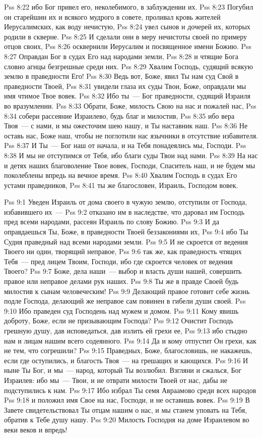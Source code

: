 \vs Pss 8:22
ибо Бог привел его, неколебимого, в заблуждении их.
\vs Pss 8:23
Погубил он старейшин их и всякого мудрого в совете, проливал кровь
жителей Иерусалимских, как воду нечистую,
\vs Pss 8:24
увел сынов и дочерей их, которых родили в скверне.
\vs Pss 8:25
И сделали они в меру нечистоты своей по примеру отцов своих,
\vs Pss 8:26
осквернили Иерусалим и посвященное имени Божию.
\vs Pss 8:27
Оправдан Бог в судах Его над народами земли,
\vs Pss 8:28
и чтящие Бога словно агнцы безгрешные среди них.
\vs Pss 8:29
Хвалим Господь, судящий всякую землю в праведности Его!
\vs Pss 8:30
Ведь вот, Боже, явил Ты нам суд Свой в праведности Твоей,
\vs Pss 8:31
увидели глаза их суды Твои, Боже, оправдали мы имя чтимое Твое
вовек.
\vs Pss 8:32
Ибо ты~--- Бог праведности, судящий Израиля во вразумлении.
\vs Pss 8:33
Обрати, Боже, милость Свою на нас и пожалей нас,
\vs Pss 8:34
собери рассеяние Израилево, будь благ и милостив,
\vs Pss 8:35
ибо вера Твоя~--- с нами, и мы ожесточим шею нашу, и Ты наставник
наш.
\vs Pss 8:36
Не оставь нас, Боже наш, чтобы не поглотили нас язычники в
отсутствие избавителя.
\vs Pss 8:37
И Ты~--- Бог наш от начала, и на Тебя понадеялись мы,
Господи.
\vs Pss 8:38
И мы не отступимся от Тебя, ибо благи суды Твои над нами.
\vs Pss 8:39
На нас и детях наших благоволение Твое вовек, Господи, Спаситель
наш, и не будем мы поколеблены впредь на вечное время.
\vs Pss 8:40
Хвалим Господь в судах Его устами праведников,
\vs Pss 8:41
ты же благословен, Израиль, Господом вовек.

\vs Pss 9:1
Уведен Израиль от дома своего в чужую землю, отступили от
Господа, избавившего их~---
\vs Pss 9:2
отказано им в наследстве, что даровал им Господь
пред всеми народами, рассеян Израиль по слову Божию.
\vs Pss 9:3
И да оправдаешься Ты, Боже, в праведности Твоей беззакониями
их,
\vs Pss 9:4
ибо Ты Судия праведный над всеми народами земли.
\vs Pss 9:5
И не скроется от ведения Твоего ни один, творящий неправое,
\vs Pss 9:6
так же, как праведность чтящих Тебя~--- пред лицем Твоим,
Господи, ибо где скроется человек от ведения Твоего?
\vs Pss 9:7
Боже, дела наши~--- выбор и власть души нашей, совершить
правое или неправое делами рук наших.
\vs Pss 9:8
Ты же в правде Своей будь милостив к сынам человеческим!
\vs Pss 9:9
Делающий правое готовит себе жизнь подле Господа, делающий же
неправое сам повинен в гибели души своей.
\vs Pss 9:10
Ибо праведен суд Господень над мужем и домом.
\vs Pss 9:11
Кому явишь доброту, Боже, если не призывающим Господа?
\vs Pss 9:12
Очистит Господь грешную душу, дав исповедаться, дав излить ей грехи
ее,
\vs Pss 9:13
ибо стыдно нам и лицам нашим всего содеянного.
\vs Pss 9:14
Да и кому отпустит Он грехи, как не тем, что согрешили?
\vs Pss 9:15
Праведных, Боже, благословишь, не накажешь, если где оступились, и
благость Твоя~--- на грешащих и кающихся.
\vs Pss 9:16
И ныне Ты Бог, и мы~--- народ, который Ты возлюбил. Взгляни и
сжалься, Бог Израилев: ибо мы~--- Твои, и не отврати милости Твоей от нас,
дабы не подступились к нам.
\vs Pss 9:17
Ибо избрал Ты семя Авраамово среди всех народов
\vs Pss 9:18
и положил имя Свое на нас, Господи, и не оставишь вовек.
\vs Pss 9:19
В Завете свидетельствовал Ты отцам нашим о нас, и мы станем уповать
на Тебя, обратив к Тебе душу нашу.
\vs Pss 9:20
Милость Господня на доме Израилевом во веки веков и впредь!

